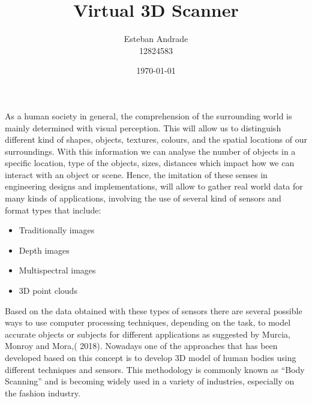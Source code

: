 \documentclass[a4paper]{article}
\title{\Large{\textbf{Virtual 3D Scanner}}}
\author{Esteban Andrade\\ 
12824583}
\date{\today}
\begin{document}
\maketitle


\section*{}
As a human society in general, the comprehension of the surrounding world is mainly determined with visual perception.
This will allow us to distinguish different kind of shapes, objects, textures, colours, and the spatial locations of our surroundings.
With this information we can analyse the number of objects in a specific location, type of the objects, sizes, distances which impact how we can interact with an object or scene.
Hence, the imitation of these senses in engineering designs and implementations, will allow to gather real world data for many kinds of applications, involving the use of several kind of sensors and format types that include: 
 \begin{itemize}
    \itemsep0em 
     \item Traditionally images
     \item Depth images
     \item Multispectral images
     \item 3D point clouds 
 \end{itemize}
 Based on the data obtained with these types of sensors there are several possible ways to use computer processing techniques, depending on the task, to model accurate objects or subjects for different applications as suggested by Murcia, Monroy and Mora,( 2018). 
 Nowadays one of the approaches that has been developed based on this concept is to develop 3D model of human bodies using different techniques and sensors.
 This methodology is commonly known as “Body Scanning” and is becoming widely used in a variety of industries, especially on the fashion industry. 
 
\end{document}
